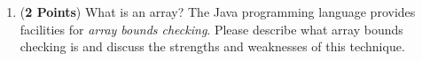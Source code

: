 \documentclass[12pt]{article}
\begin{document}
\begin{enumerate}
\begin{enumerate}
\item ({\bf 2 Points}) What is an array?  The Java programming
  language provides facilities for {\em array bounds checking}.
  Please describe what array bounds checking is and discuss the
  strengths and weaknesses of this technique.

\end{enumerate}

\newpage


  
  

  


\end{enumerate}
\end{document}

